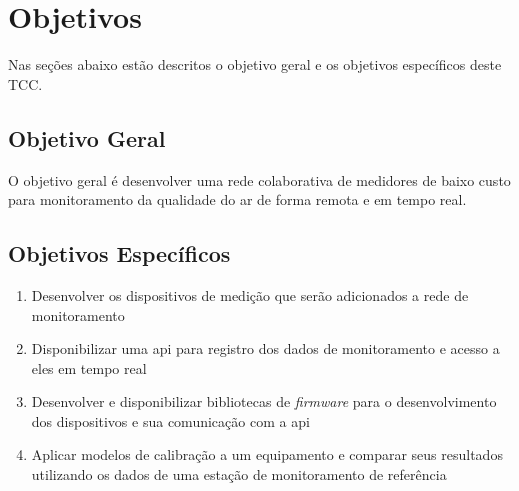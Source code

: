 \section{Objetivos}

Nas seções abaixo estão descritos o objetivo geral e os objetivos específicos deste TCC.

\subsection{Objetivo Geral}

O objetivo geral é desenvolver uma rede colaborativa de medidores de baixo custo para monitoramento da qualidade do ar de forma remota e em tempo real.

\subsection{Objetivos Específicos}

\begin{enumerate}
    \item Desenvolver os dispositivos de medição que serão adicionados a rede de monitoramento
    \item Disponibilizar uma \acrshort{api} para registro dos dados de monitoramento e acesso a eles em tempo real
    \item Desenvolver e disponibilizar bibliotecas de \textit{firmware} para o desenvolvimento dos dispositivos e sua comunicação com a \acrshort{api}
    \item Aplicar modelos de calibração a um equipamento e comparar seus resultados utilizando os dados de uma estação de monitoramento de referência
\end{enumerate}